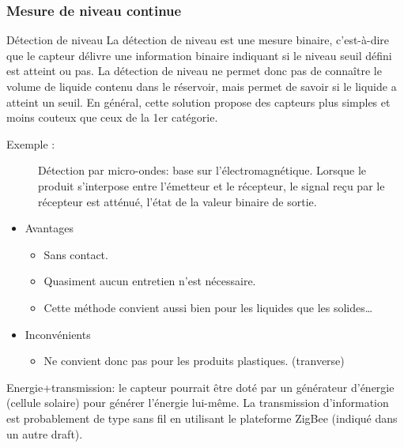 	\subsubsection {Mesure de niveau continue} Détection de niveau 
	La détection de niveau est une mesure binaire, c'est-à-dire que le capteur délivre une information binaire indiquant si le niveau seuil défini est atteint ou 		pas. La détection de niveau ne permet donc pas de connaître le volume de liquide contenu dans le réservoir, mais permet de savoir si le liquide a atteint un 		seuil. En général, cette solution propose des capteurs plus simples et moins couteux que ceux de la 1er catégorie.

	\begin {description}
		\item [Exemple :]
	Détection par micro-ondes: base sur l’électromagnétique. Lorsque le produit s'interpose entre l'émetteur et le récepteur, le signal reçu par le récepteur est atténué,  l'état de la valeur binaire de sortie.
	\end {description}
	\begin {itemize}
		\item Avantages 
		\begin {itemize}
			\item Sans contact. 
			\item Quasiment aucun entretien n'est nécessaire. 
			\item Cette méthode convient aussi bien pour les liquides que les solides…
		\end {itemize}
		\item Inconvénients
		\begin {itemize}
			\item Ne convient donc pas pour les produits plastiques. (tranverse)
		\end {itemize}
	\end {itemize}

Energie+transmission: le capteur pourrait être doté par un générateur d'énergie (cellule solaire) pour générer l'énergie lui-même. 
La transmission d'information est probablement de type sans fil en utilisant le plateforme ZigBee (indiqué dans un autre draft). 
